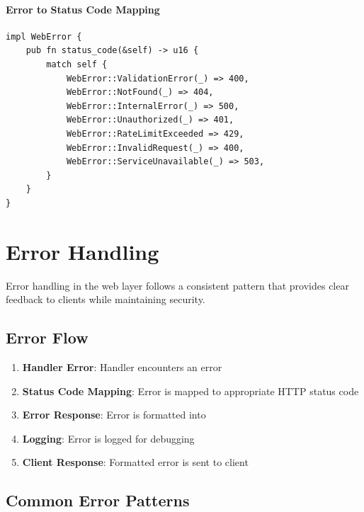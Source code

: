 \paragraph{Error to Status Code Mapping}

\begin{listing}[H]
\caption{Error to HTTP status code mapping}
\label{lst:models-error-mapping}
\begin{verbatim}
impl WebError {
    pub fn status_code(&self) -> u16 {
        match self {
            WebError::ValidationError(_) => 400,
            WebError::NotFound(_) => 404,
            WebError::InternalError(_) => 500,
            WebError::Unauthorized(_) => 401,
            WebError::RateLimitExceeded => 429,
            WebError::InvalidRequest(_) => 400,
            WebError::ServiceUnavailable(_) => 503,
        }
    }
}
\end{verbatim}
\end{listing}

\section{Error Handling}
\label{sec:error-handling}

Error handling in the web layer follows a consistent pattern that provides clear feedback to clients while maintaining security.

\subsection{Error Flow}

\begin{enumerate}
  \item \textbf{Handler Error}: Handler encounters an error
  \item \textbf{Status Code Mapping}: Error is mapped to appropriate HTTP status code
  \item \textbf{Error Response}: Error is formatted into 
  \item \textbf{Logging}: Error is logged for debugging
  \item \textbf{Client Response}: Formatted error is sent to client
\end{enumerate}

\subsection{Common Error Patterns}


